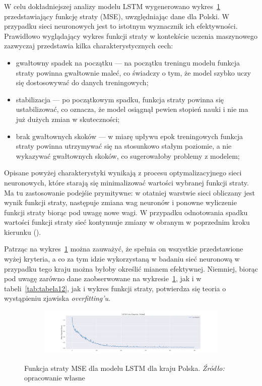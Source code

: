 \documentclass[polish, twoside, 12pt, a4paper]{article}
\theoremstyle{definition}
\theoremstyle{plain}
\theoremstyle{remark}
\begin{document}
W celu dokładniejszej analizy modelu LSTM wygenerowano wykres~\ref{fig:x14} przedstawiający funkcję straty (MSE), uwzględniając dane dla Polski. W przypadku sieci neuronowych jest to istotnym wyznacznik ich efektywności. Prawidłowo wyglądający wykres funkcji straty w kontekście uczenia maszynowego zazwyczaj przedstawia kilka charakterystycznych cech:

\begin{itemize}[noitemsep]
	\item gwałtowny spadek na początku --- na początku treningu modelu funkcja straty powinna gwałtownie maleć, co świadczy o tym, że model szybko uczy się dostosowywać do danych treningowych;
	\item stabilizacja --- po początkowym spadku, funkcja straty powinna się ustabilizować, co oznacza, że model osiągnął pewien stopień nauki i nie ma już dużych zmian w skuteczności;
	\item brak gwałtownych skoków --- w miarę upływu epok treningowych funkcja straty powinna utrzymywać się na stosunkowo stałym poziomie, a nie wykazywać gwałtownych skoków, co sugerowałoby problemy z modelem;
\end{itemize}
Opisane powyżej charakterystyki wynikają z procesu optymalizacyjnego sieci neuronowych, które starają się minimalizować wartości wybranej funkcji straty. Ma tu zastosowanie podejśie prymitywne: w otatniej warstwie sieci obliczany jest wynik funkcji straty, następuje zmiana wag neuronów i ponowne wyliczenie funkcji straty biorąc pod uwagę nowe wagi. W przypadku odnotowania spadku wartości funkcji straty sieć kontynuuje zmiany w obranym w poprzednim kroku kierunku (\cite{brzezinski2021}). 

Patrząc na wykres~\ref{fig:x14} można zauważyć, że spełnia on wszystkie przedstawione wyżej kryteria, a co za tym idzie wykorzystaną w badaniu sieć neuronową w przypadku tego kraju można byłoby określić mianem efektywnej. Niemniej, biorąc pod uwagę zarówno dane zaobserwowane na wykresie~\ref{fig:x14}, jak i w tabeli~\ref{tab:tabela12}, jak i wykres funkcji straty, potwierdza się teoria o wystąpieniu zjawiska \textit{overfitting'u}. 

\begin{figure}[hbt]
  \centering

  \begin{subfigure}[t]{0.95\textwidth}
    \includegraphics[width=\textwidth]{./out_figures/lstm_loss_function_Poland.png}
  \end{subfigure}

  \captionsetup{margin=10pt,font=small,labelfont=bf,width=.8\textwidth}

  \caption[Funkcja straty MSE dla modelu LSTM dla kraju Polska.]{Funkcja straty MSE dla modelu LSTM dla kraju Polska. \textit{Źródło:} opracowanie własne}\label{fig:x14}
\end{figure}
\end{document}
